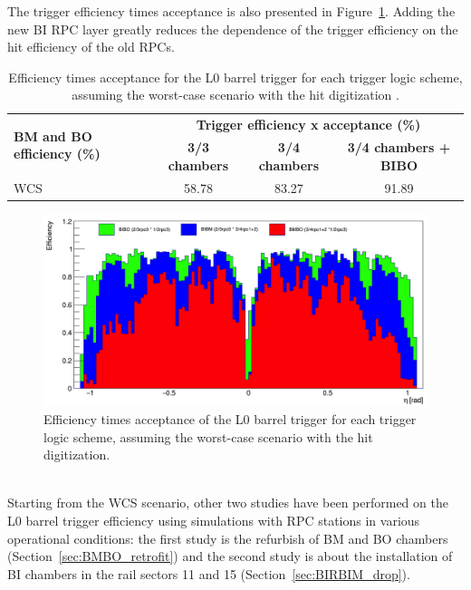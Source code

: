The trigger efficiency times acceptance is also presented in Figure~\ref{fig:h_eff}. 
Adding the new BI RPC layer greatly reduces the dependence of the trigger efficiency on the hit efficiency of the old RPCs.
\begin{table}[h]
	\centering
	\small
	\begin{tabular}{l|c|c|c}
		\hline
		\multirow{2}{*}{\textbf{BM and BO efficiency (\%)}} & \multicolumn{3}{c}{\textbf{Trigger efficiency x acceptance (\%)}}\\
		\cline{2-4}   
		& \textbf{3/3 chambers} & \textbf{3/4 chambers} & \textbf{3/4 chambers + BIBO}\\
		\hline 
		WCS 												& 58.78 				& 83.27 		& 91.89\\
		\hline 
	\end{tabular} 
	\caption{Efficiency times acceptance for the L0 barrel trigger for each trigger logic scheme, assuming the worst-case scenario with the hit digitization  .} 
	\label{tab:eff_x_acc_wcs}
	\end{table} 
\begin{figure}[!h]
	\centering
	\includegraphics[width=1\textwidth]{Chapters/CH3/figures/h_eff}
	\caption{Efficiency times acceptance of the L0 barrel trigger for each trigger logic scheme, assuming the worst-case scenario with the hit digitization.}
	\label{fig:h_eff}
\end{figure}
\\Starting from the WCS scenario, other two studies have been performed on the L0 barrel trigger 
efficiency using simulations with RPC stations in various operational conditions: the first study is the  refurbish of BM and BO chambers (Section~\ref{sec:BMBO_retrofit}) and the second study is about the installation of BI chambers in the rail sectors 11 and 15 (Section~\ref{sec:BIRBIM_drop}).
\FloatBarrier


